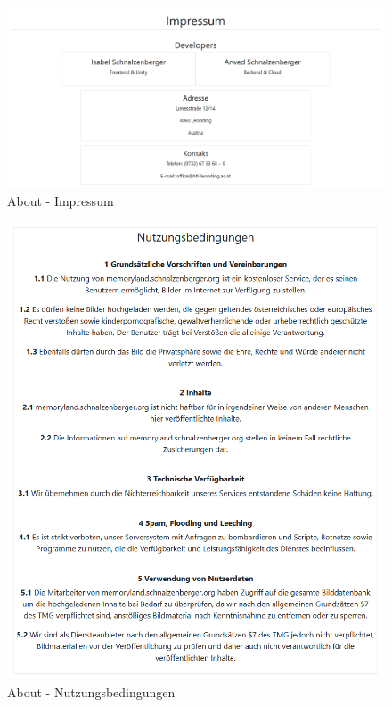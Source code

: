 \begin{figure} [h t]
    \centering
    \includegraphics[scale=0.4]{pics/About_page_Impressum.PNG}
    \caption{About - Impressum}
    \label{fig:about-page-impressum}
\end{figure}



\begin{figure} [h t]
    \centering
    \includegraphics[scale=0.8]{pics/About_page_Nutzungsbedingungen.PNG}
    \caption{About - Nutzungsbedingungen}
    \label{fig:about-page-nutzungsbedingungen}
\end{figure}


